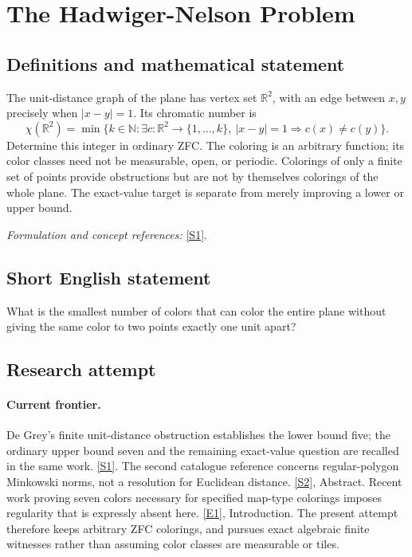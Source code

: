 \documentclass[11pt,a4paper]{article}
\newcommand{\N}{\mathbb{N}}
\newcommand{\R}{\mathbb{R}}
\newcommand{\sref}[2]{\hyperlink{source:#1:#2}{[S#2]}}
\newcommand{\eref}[2]{\hyperlink{extra:#1:#2}{[E#2]}}
\newif\ifshowcatalogue
\newcommand{\cataloguescope}[1]{\ifshowcatalogue
 \paragraph{Exact scope in the supplied catalogue.}
 \begin{quote}\small #1\end{quote}\fi}
\numberwithin{equation}{section}
\begin{document}
\setcounter{section}{0}
\clearpage
\section*{\texorpdfstring{The Hadwiger-Nelson Problem}{The Hadwiger-Nelson Problem}}\label{10}
\subsection{Definitions and mathematical statement}
The unit-distance graph of the plane has vertex set $\R^2$, with an edge between $x,y$ precisely when $|x-y|=1$. Its chromatic number is
\[
 \chi(\R^2)=\min\{k\in\N:\exists c:\R^2\to\{1,\ldots,k\},
 \ |x-y|=1\Rightarrow c(x)\ne c(y)\}.
\]
Determine this integer in ordinary ZFC. The coloring is an arbitrary function; its color classes need not be measurable, open, or periodic. Colorings of only a finite set of points provide obstructions but are not by themselves colorings of the whole plane. The exact-value target is separate from merely improving a lower or upper bound.
\par\smallskip\textit{Formulation and concept references:} \sref{10}{1}.
\cataloguescope{Determine the chromatic number of the Euclidean plane: the minimum number of colours needed to colour every point so that points at distance exactly one have distinct colours, with ordinary arbitrary colourings in ZFC and no measurability requirement.}
\subsection{Short English statement}
What is the smallest number of colors that can color the entire plane without giving the same color to two points exactly one unit apart?
\subsection{Research attempt}

\paragraph{Current frontier.}
De Grey's finite unit-distance obstruction establishes the lower bound
five; the ordinary upper bound seven and the remaining exact-value
question are recalled in the same work. \sref{10}{1}.
The second catalogue reference concerns regular-polygon Minkowski norms,
not a resolution for Euclidean distance. \sref{10}{2}, Abstract.
Recent work proving seven colors necessary for specified map-type
colorings imposes regularity that is expressly absent here.
\eref{10}{1}, Introduction. The present attempt therefore keeps arbitrary
ZFC colorings, and pursues exact algebraic finite witnesses rather than
assuming color classes are measurable or tiles.
\end{document}
